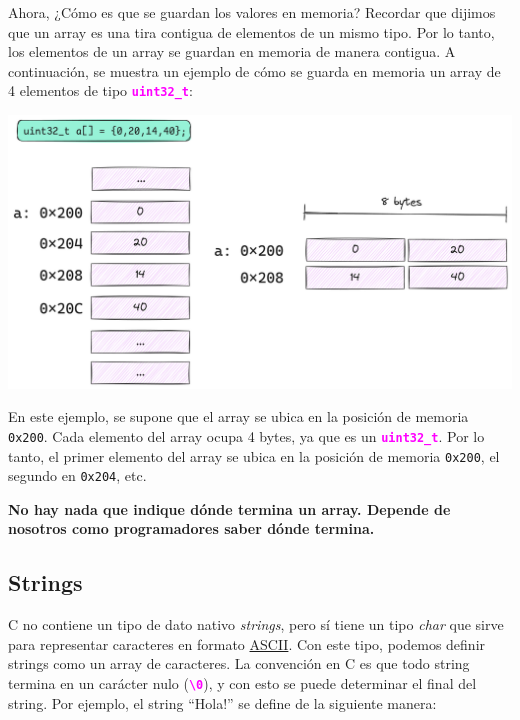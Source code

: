 \documentclass[]{scrartcl}
\newcommand{\hl}[1]{\textcolor{magenta}{\textbf{\texttt{#1}}}}
\begin{document}
Ahora, ¿Cómo es que se guardan los valores en memoria?
Recordar que dijimos que un array es una tira contigua de elementos de un mismo tipo. Por lo tanto, los elementos de un array se guardan en memoria de manera contigua. A continuación, se muestra un ejemplo de cómo se guarda en memoria un array de 4 elementos de tipo \hl{uint32\_t}:

\begin{center}
  \includegraphics[scale=0.2]{./img/array_memoria.png}
  \label{fig:array_memoria}
\end{center}

En este ejemplo, se supone que el array se ubica en la posición de memoria \texttt{0x200}. Cada elemento del array ocupa 4 bytes, ya que es un \hl{uint32\_t}. Por lo tanto, el primer elemento del array se ubica en la posición de memoria \texttt{0x200}, el segundo en \texttt{0x204}, etc.

\begin{importantbox}
  \centering
  \textbf{No hay nada que indique dónde termina un array. Depende de nosotros como programadores saber dónde termina.}
\end{importantbox}


\subsection*{Strings}
C no contiene un tipo de dato nativo \textit{strings}, pero sí tiene un tipo \textit{char} que sirve para representar caracteres en formato \href{https://www.asciitable.com/}{ASCII}. Con este tipo, podemos definir strings como un array de caracteres.
La convención en C es que todo string termina en un carácter nulo (\hl{\textquotesingle\textbackslash0}\textquotesingle), y con esto se puede determinar el final del string. Por ejemplo, el string ``Hola!'' se define de la siguiente manera:
\end{document}
